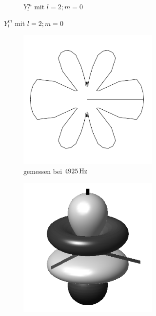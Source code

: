 \documentclass[numbers=noenddot,12pt,a4paper]{scrartcl}
\begin{document}
\begin{figure}[H]
\begin{subfigure}[h]{0.3\textwidth}
\begin{subfigure}[b]{\textwidth}
			\caption{$Y_l^m$ mit $l=2;m=0$} \label{img:l2y}
		\end{subfigure}
	\end{subfigure}
	\begin{subfigure}[h]{0.3\textwidth}
		\begin{subfigure}[b]{\textwidth}
			\includegraphics[angle=90,origin=c,width=\textwidth]{messwerte/polarl3.pdf}
			\caption{gemessen bei $\unit[4925]{Hz}$} \label{img:l3}
		\end{subfigure}
		\begin{subfigure}[b]{\textwidth}
			\includegraphics[width=\textwidth]{Spherical_Harmonics_deg3l3m0.png}

\end{subfigure}
\end{subfigure}
\end{figure}
\end{document}
